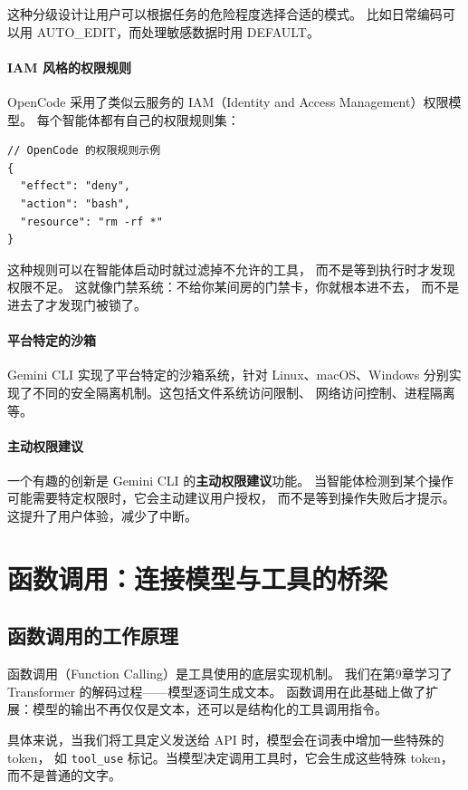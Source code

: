 这种分级设计让用户可以根据任务的危险程度选择合适的模式。
比如日常编码可以用 AUTO\_EDIT，而处理敏感数据时用 DEFAULT。

\paragraph{IAM 风格的权限规则}
OpenCode 采用了类似云服务的 IAM（Identity and Access Management）权限模型。
每个智能体都有自己的权限规则集：

\begin{verbatim}
// OpenCode 的权限规则示例
{
  "effect": "deny",
  "action": "bash",
  "resource": "rm -rf *"
}
\end{verbatim}

这种规则可以在智能体启动时就过滤掉不允许的工具，
而不是等到执行时才发现权限不足。
这就像门禁系统：不给你某间房的门禁卡，你就根本进不去，
而不是进去了才发现门被锁了。

\paragraph{平台特定的沙箱}
Gemini CLI 实现了平台特定的沙箱系统，针对 Linux、macOS、Windows
分别实现了不同的安全隔离机制。这包括文件系统访问限制、
网络访问控制、进程隔离等。

\paragraph{主动权限建议}
一个有趣的创新是 Gemini CLI 的\textbf{主动权限建议}功能。
当智能体检测到某个操作可能需要特定权限时，它会主动建议用户授权，
而不是等到操作失败后才提示。这提升了用户体验，减少了中断。

\section{函数调用：连接模型与工具的桥梁}

\subsection{函数调用的工作原理}

函数调用（Function Calling）是工具使用的底层实现机制。
我们在第9章学习了 Transformer 的解码过程——模型逐词生成文本。
函数调用在此基础上做了扩展：模型的输出不再仅仅是文本，还可以是结构化的工具调用指令。

具体来说，当我们将工具定义发送给 API 时，模型会在词表中增加一些特殊的 token，
如 \texttt{tool\_use} 标记。当模型决定调用工具时，它会生成这些特殊 token，
而不是普通的文字。

